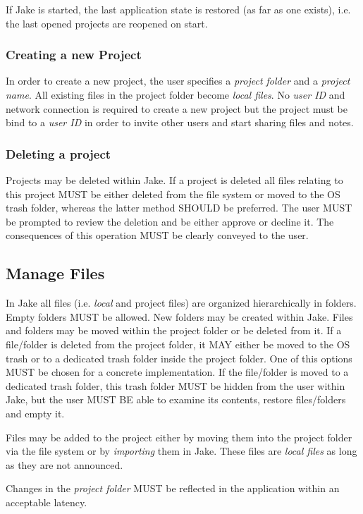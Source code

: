 If Jake is started, the last application state is restored (as far as one exists), i.e. the last opened projects are reopened on start.

\subsubsection{Creating a new Project}
In order to create a new project, the user specifies a \emph{project folder} and a \emph{project name}. All existing files in the project folder become \emph{local files}. No \emph{user ID} and network connection is required to create a new project but the project must be bind to a \emph{user ID} in order to invite other users and start sharing files and notes.

\subsubsection{Deleting a project}
Projects may be deleted within Jake. If a project is deleted all files relating to this project MUST be either deleted from the file system or moved to the OS trash folder, whereas the latter method SHOULD be preferred. The user MUST be prompted to review the deletion and be either approve or decline it. The consequences of this operation MUST be clearly conveyed to the user.

\subsection{Manage Files}
In Jake all files (i.e. \emph{local} and {project files}) are organized hierarchically in folders. Empty folders MUST be allowed. New folders may be created within Jake. Files and folders may be moved within the project folder or be deleted from it. If a file/folder is deleted from the project folder, it MAY either be moved to the OS trash or to a dedicated trash folder inside the project folder. One of this options MUST be chosen for a concrete implementation. If the file/folder is moved to a dedicated trash folder, this trash folder MUST be hidden from the user within Jake, but the user MUST BE able to examine its contents, restore files/folders and empty it. 

Files may be added to the project either by moving them into the project folder via the file system or by \emph{importing} them in Jake. These files are \emph{local files} as long as they are not announced. 

Changes in the \emph{project folder} MUST be reflected in the application within an acceptable latency.


